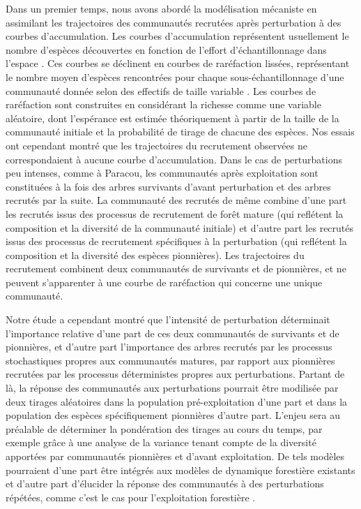 \documentclass[
  11pt,
  french,
  A4paper,
  extrafontsizes,onecolumn,openright
  ]{memoir}
\begin{document}
Dans un premier temps, nous avons abordé la modélisation mécaniste en
assimilant les trajectoires des communautés recrutées après perturbation
à des courbes d'accumulation. Les courbes d'accumulation représentent
usuellement le nombre d'espèces découvertes en fonction de l'effort
d'échantillonnage dans l'espace \autocite{Gotelli2001}. Ces courbes se
déclinent en courbes de raréfaction lissées, représentant le nombre
moyen d'espèces rencontrées pour chaque sous-échantillonnage d'une
communauté donnée selon des effectifs de taille variable
\autocite{Ugland2003}. Les courbes de raréfaction sont construites en
considérant la richesse comme une variable aléatoire, dont l'espérance
est estimée théoriquement à partir de la taille de la communauté
initiale et la probabilité de tirage de chacune des espèces. Nos essais
ont cependant montré que les trajectoires du recrutement observées ne
correspondaient à aucune courbe d'accumulation. Dans le cas de
perturbations peu intenses, comme à Paracou, les communautés après
exploitation sont constituées à la fois des arbres survivants d'avant
perturbation et des arbres recrutés par la suite. La communauté des
recrutés de même combine d'une part les recrutés issus des processus de
recrutement de forêt mature (qui reflétent la composition et la
diversité de la communauté initiale) et d'autre part les recrutés issus
des processus de recrutement spécifiques à la perturbation (qui
reflétent la composition et la diversité des espèces pionnières). Les
trajectoires du recrutement combinent deux communautés de survivants et
de pionnières, et ne peuvent s'apparenter à une courbe de raréfaction
qui concerne une unique communauté.

Notre étude a cependant montré que l'intensité de perturbation
déterminait l'importance relative d'une part de ces deux communautés de
survivants et de pionnières, et d'autre part l'importance des arbres
recrutés par les processus stochastiques propres aux communautés
matures, par rapport aux pionnières recrutées par les processus
déterministes propres aux perturbations. Partant de là, la réponse des
communautés aux perturbations pourrait être modilisée par deux tirages
aléatoires dans la population pré-exploitation d'une part et dans la
population des espèces spécifiquement pionnières d'autre part. L'enjeu
sera au préalable de déterminer la pondération des tirages au cours du
temps, par exemple grâce à une analyse de la variance tenant compte de
la diversité apportées par communautés pionnières et d'avant
exploitation. De tels modèles pourraient d'une part être intégrés aux
modèles de dynamique forestière existants et d'autre part d'élucider la
réponse des communautés à des perturbations répétées, comme c'est le cas
pour l'exploitation forestière \autocite{Dufour2012}.
\end{document}
